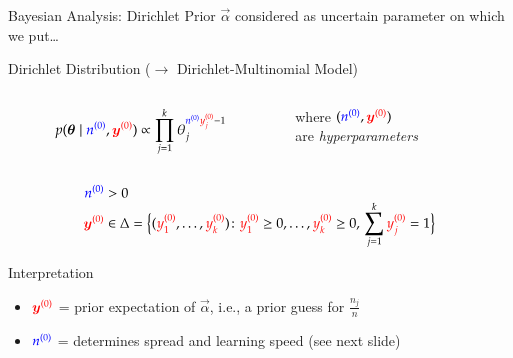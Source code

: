\documentclass{beamer}
\def\rot#1{{\color{red}#1}}
\def\gruen#1{{\color{blue}#1}}
\def\byzr{\rot{\byz}}
\def\yzor{\rot{y\uz_1}}
\def\yzjr{\rot{y\uz_j}}
\def\yzkr{\rot{y\uz_k}}
\def\nzg{\gruen{\nz}}
\begin{document}
\begin{frame}{Bayesian Analysis: Dirichlet Prior}
  $\vec{\alpha}$ considered as uncertain parameter on which we put\dots
  \begin{block}{Dirichlet Distribution ($\to$ Dirichlet-Multinomial Model)}
  \begin{columns}
  \begin{column}{0.65\textwidth}
    \begin{align*}
      p(\vec{\theta}\mid \nzg,\byzr) \propto \prod_{j=1}^k\theta_j^{\nzg\yzjr-1}
    \end{align*}
  \end{column}  
  \begin{column}{0.35\textwidth}
    \rule{0ex}{3ex}where $(\nzg, \byzr)$\\ are \emph{hyperparameters}
 \end{column}
 \end{columns}\vspace*{-1.8ex}
    \begin{align*}
      \nzg &> 0\\[-1ex]
      \byzr &\in \Delta=\Big\{
        (\yzor,\dots,\yzkr)\colon \yzor\ge0,\dots,\yzkr\ge 0,\,\sum_{j=1}^k \yzjr=1
      \Big\}
    \end{align*}
  \end{block}
  \vspace*{-0.5ex}
  \begin{block}{Interpretation}
    \begin{itemize}
    \item $\byzr$ = \alert{prior expectation of $\vec{\alpha}$}, i.e., a prior guess for $\frac{n_j}{n}$ %
    \item $\nzg$ = determines \alert{spread} and \alert{learning speed} (see next slide)
    \end{itemize}
  \end{block}
\end{frame}
\end{document}
